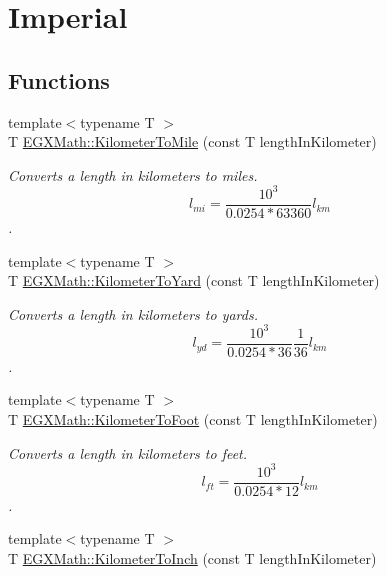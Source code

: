 \hypertarget{group___e_g_x_math-_conversions-_length_conversions-_s_i-_kilometer-_imperial}{}\section{Imperial}
\label{group___e_g_x_math-_conversions-_length_conversions-_s_i-_kilometer-_imperial}
\subsection*{Functions}
\begin{DoxyCompactItemize}
\item 
{\footnotesize template$<$typename T $>$ }\\T \mbox{\hyperlink{group___e_g_x_math-_conversions-_length_conversions-_s_i-_kilometer-_imperial_ga781cd502fe13eb76e4e6b8e1fa7d55ed}{E\+G\+X\+Math\+::\+Kilometer\+To\+Mile}} (const T length\+In\+Kilometer)
\begin{DoxyCompactList}\small\item\em Converts a length in kilometers to miles. \[ l_{mi}=\frac{10^{3}}{0.0254 * 63360} l_{km} \]. \end{DoxyCompactList}\item 
{\footnotesize template$<$typename T $>$ }\\T \mbox{\hyperlink{group___e_g_x_math-_conversions-_length_conversions-_s_i-_kilometer-_imperial_ga98f724c96246bb6dcb517fc64ff5ade1}{E\+G\+X\+Math\+::\+Kilometer\+To\+Yard}} (const T length\+In\+Kilometer)
\begin{DoxyCompactList}\small\item\em Converts a length in kilometers to yards. \[ l_{yd}= \frac{10^{3}}{0.0254 * 36} \frac{1}{36} l_{km} \]. \end{DoxyCompactList}\item 
{\footnotesize template$<$typename T $>$ }\\T \mbox{\hyperlink{group___e_g_x_math-_conversions-_length_conversions-_s_i-_kilometer-_imperial_ga8e07a35f01e011462db88b5cb2896416}{E\+G\+X\+Math\+::\+Kilometer\+To\+Foot}} (const T length\+In\+Kilometer)
\begin{DoxyCompactList}\small\item\em Converts a length in kilometers to feet. \[ l_{ft}= \frac{10^{3}}{0.0254 * 12} l_{km} \]. \end{DoxyCompactList}\item 
{\footnotesize template$<$typename T $>$ }\\T \mbox{\hyperlink{group___e_g_x_math-_conversions-_length_conversions-_s_i-_kilometer-_imperial_ga6f1d41be3b2039495abff4f256148aa7}{E\+G\+X\+Math\+::\+Kilometer\+To\+Inch}} (const T length\+In\+Kilometer)

\end{DoxyCompactItemize}
